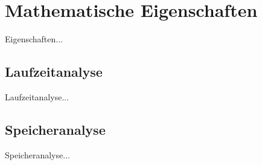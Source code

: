 \section{Mathematische Eigenschaften}
Eigenschaften...
\subsection{Laufzeitanalyse}
Laufzeitanalyse\autocite{sedgewick-1996}...
\subsection{Speicheranalyse}
Speicheranalyse...
